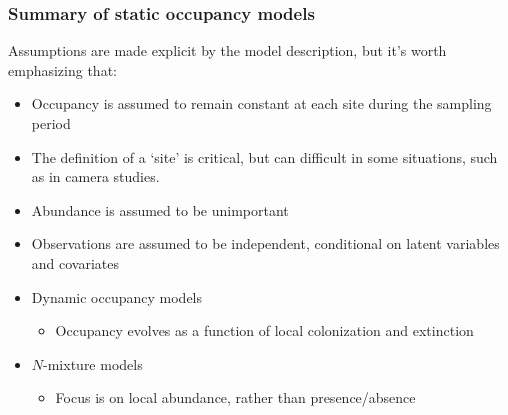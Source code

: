 \documentclass[color=usenames,dvipsnames]{beamer}\usepackage[]{graphicx}\usepackage[]{color}
\begin{document}




\begin{frame}
  \frametitle{Summary of static occupancy models}
  \small
  Assumptions are made explicit by the model description, but it's worth emphasizing that: 
  \begin{itemize}[<+->]
    \item<2-> Occupancy is assumed to remain constant at each site during the sampling period
    \item<3-> The definition of a `site' is critical, but can difficult in
      some situations, such as in camera studies.
    \item<4-> Abundance is assumed to be unimportant
    \item<5-> Observations are assumed to be independent, conditional
      on latent variables and covariates
  \end{itemize}
  \vfill
  \begin{itemize}
    \item<7-> Dynamic occupancy models
    \begin{itemize}
      \item Occupancy evolves as a function of local colonization
        and extinction
    \end{itemize}
    \item<8-> $N$-mixture models
    \begin{itemize}
      \item Focus is on local abundance, rather than presence/absence
    \end{itemize}
  \end{itemize}
  \vfill
\end{frame}
\end{document}
